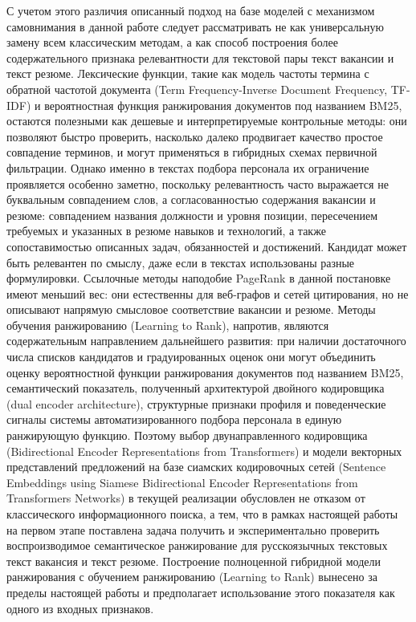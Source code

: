С учетом этого различия описанный подход на базе моделей с механизмом самовнимания в данной работе следует рассматривать не как универсальную замену всем классическим методам, а как способ построения более содержательного признака релевантности для текстовой пары текст вакансии и текст резюме. Лексические функции, такие как модель частоты термина с обратной частотой документа (Term Frequency-Inverse Document Frequency, TF-IDF) и вероятностная функция ранжирования документов под названием BM25, остаются полезными как дешевые и интерпретируемые контрольные методы: они позволяют быстро проверить, насколько далеко продвигает качество простое совпадение терминов, и могут применяться в гибридных схемах первичной фильтрации. Однако именно в текстах подбора персонала их ограничение проявляется особенно заметно, поскольку релевантность часто выражается не буквальным совпадением слов, а согласованностью содержания вакансии и резюме: совпадением названия должности и уровня позиции, пересечением требуемых и указанных в резюме навыков и технологий, а также сопоставимостью описанных задач, обязанностей и достижений. Кандидат может быть релевантен по смыслу, даже если в текстах использованы разные формулировки. Ссылочные методы наподобие PageRank в данной постановке имеют меньший вес: они естественны для веб-графов и сетей цитирования, но не описывают напрямую смысловое соответствие вакансии и резюме. Методы обучения ранжированию (Learning to Rank), напротив, являются содержательным направлением дальнейшего развития: при наличии достаточного числа списков кандидатов и градуированных оценок они могут объединить оценку вероятностной функции ранжирования документов под названием BM25, семантический показатель, полученный архитектурой двойного кодировщика (dual encoder architecture), структурные признаки профиля и поведенческие сигналы системы автоматизированного подбора персонала в единую ранжирующую функцию. Поэтому выбор двунаправленного кодировщика (Bidirectional Encoder Representations from Transformers) и модели векторных представлений предложений на базе сиамских кодировочных сетей (Sentence Embeddings using Siamese Bidirectional Encoder Representations from Transformers Networks) в текущей реализации обусловлен не отказом от классического информационного поиска, а тем, что в рамках настоящей работы на первом этапе поставлена задача получить и экспериментально проверить воспроизводимое семантическое ранжирование для русскоязычных текстовых текст вакансия и текст резюме. Построение полноценной гибридной модели ранжирования с обучением ранжированию (Learning to Rank) вынесено за пределы настоящей работы и предполагает использование этого показателя как одного из входных признаков.\par
